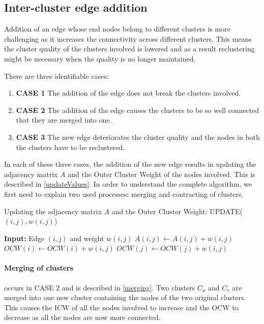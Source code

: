 \subsection{Inter-cluster edge addition}

Addition of an edge whose end nodes belong to different clusters is more challenging as it increases the connectivity across different clusters. This means the cluster quality of the clusters involved is lowered and as a result reclustering might be necessary when the quality is no longer maintained. 

There are three identifiable cases:

\begin{enumerate}
	\item \textbf{CASE 1} The addition of the edge does not break the clusters involved.
	\item \textbf{CASE 2} The addition of the edge causes the clusters to be so well connected that they are merged into one.
	\item \textbf{CASE 3} The new edge deteriorates the cluster quality and the nodes in both the clusters have to be reclustered.
\end{enumerate}

In each of these three cases, the addition of the new edge results in updating the adjacency matrix $A$ and the Outer Cluster Weight of the nodes involved. This is described in \autoref{updateValues}. In order to understand the complete algorithm, we first need to explain two used processes: merging and contracting of clusters.

\begin{algorithm}
\caption{Updating the adjacency matrix $A$ and the Outer Cluster Weight: UPDATE($(i,j),w(i,j)$)}
\label{merging}
\begin{algorithmic}
\STATE \textbf{Input:} Edge $(i,j)$ and weight $w(i,j)$
\STATE $A(i,j) \leftarrow A(i,j) + w(i,j)$
\STATE $OCW(i) \leftarrow OCW(i) + w(i,j)$
\STATE $OCW(j) \leftarrow OCW(j) + w(i,j)$
\end{algorithmic}
\end{algorithm}

\paragraph{Merging of clusters} occurs in CASE 2 and is described in \autoref{merging}. Two clusters $C_u$ and $C_v$ are merged into one new cluster containing the nodes of the two original clusters. This causes the ICW of all the nodes involved to increase and the OCW to decrease as all the nodes are now more connected.

